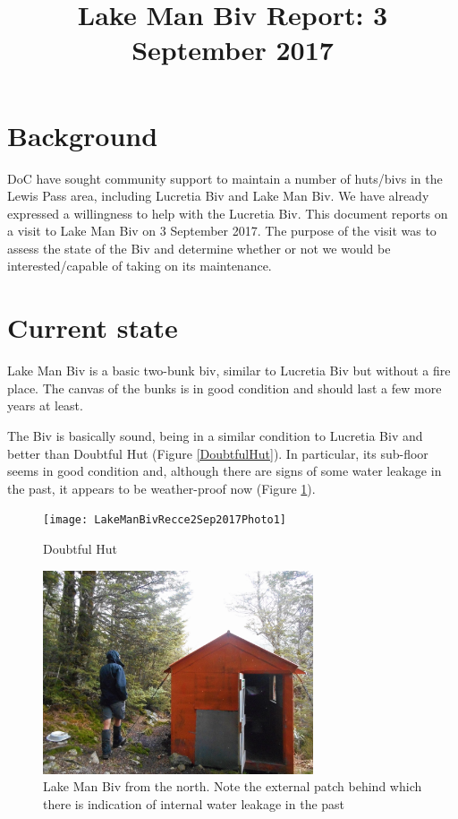 \documentclass[12pt]{article} %
\title{Lake Man Biv Report: 3 September 2017}
\makeatletter
\renewcommand{\maketitle}{%
  {\bfseries{\scshape{\Large{\@title\par}}}}
}
\makeatother
\begin{document}
  \maketitle

\section{Background}

DoC have sought community support to maintain a number of huts/bivs in the Lewis Pass area, including Lucretia Biv and Lake Man Biv.  We have already expressed a willingness to help with the Lucretia Biv.  This document reports on a visit to Lake Man Biv on 3 September 2017.  The purpose of the visit was to assess the state of the Biv and determine whether or not we would be interested/capable of taking on its maintenance.

\section{Current state}

Lake Man Biv is a basic two-bunk biv, similar to Lucretia Biv but without a fire place.  The canvas of the bunks is in good condition and should last a few more years at least.

The Biv is basically sound, being in a similar condition to Lucretia Biv and better than Doubtful Hut (Figure \ref{DoubtfulHut}).  In particular, its sub-floor seems in good condition and, although there are signs of some water leakage in the past, it appears to be weather-proof now (Figure \ref{LMB1}).

\begin{figure}[ht]
\begin{minipage}{.5\linewidth}
\begin{flushleft}
  \texttt{[image: LakeManBivRecce2Sep2017Photo1]}
  \caption{Doubtful Hut}
  \label{DoubtfulHut}
\end{flushleft}
\end{minipage}
\begin{minipage}{.5\linewidth}
\begin{center}
  \includegraphics[width=8cm]{LakeManBivRecce2Sep2017Photo2}
  \caption{Lake Man Biv from the north.  Note the external patch behind which there is indication of internal water leakage in the past}
  \label{LMB1}
\end{center}
\end{minipage}
\end{figure}
\end{document}

